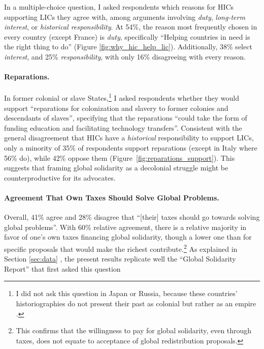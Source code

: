 \documentclass[12pt,english]{article}
\begin{document}
\begin{bibunit}
In a multiple-choice question, I asked respondents which reasons for HICs supporting LICs they agree with, among arguments involving \textit{duty}, \textit{long-term interest}, or \textit{historical responsibility}. At 54\%, the reason most frequently chosen in every country (except France) is \textit{duty}, specifically ``Helping countries in need is the right thing to do'' (Figure \ref{fig:why_hic_help_lic}). Additionally, 38\% select \textit{interest}, and 25\% \textit{responsibility}, with only 16\% disagreeing with every reason.

\paragraph{Reparations.}\label{par:reparations}

In former colonial or slave States,\footnote{I did not ask this question in Japan or Russia, because these countries' historiographies do not present their past as colonial but rather  as an empire%
.} 
I asked respondents whether they would support ``reparations for colonization and slavery to former colonies and descendants of slaves'', specifying that the reparations ``could take the form of funding education and facilitating technology transfers''. Consistent with the general disagreement that HICs have a \textit{historical} responsibility to support LICs, only a minority of 35\% of respondents support reparations (except in Italy where 56\% do), while 42\% oppose them (Figure~\ref{fig:reparations_support}). This suggests that framing global solidarity as a decolonial struggle might be counterproductive %
for its advocates. %

\paragraph{Agreement That Own Taxes Should Solve Global Problems.}\label{par:my_tax}

Overall, 41\% agree and 28\% disagree that ``[their] taxes should go towards solving global problems''. With 60\% relative agreement, there is a relative majority in favor of one's own taxes financing global solidarity, though a lower one than for specific proposals that would make the richest contribute.\footnote{This confirms that the willingness to pay for global solidarity, even through taxes, does not equate to acceptance of global redistribution proposals.%
} 
As explained in Section \ref{sec:data}%
, the present results replicate well the ``Global Solidarity Report'' that first asked this question \citep{global_nation_global_2023}


\end{bibunit}
\end{document}
